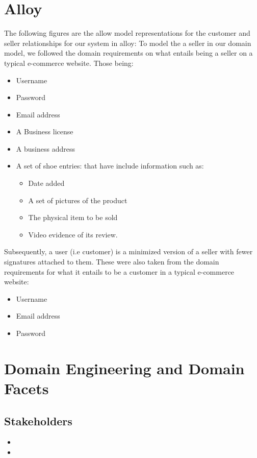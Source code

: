 \section{Alloy}
The following figures are the allow model representations for the customer and seller relationships for our system in alloy:
To model the a seller in our domain model, we followed the domain requirements on what entails being a seller on a typical e-commerce website. Those being:
\begin{itemize}
  \item Username
  \item Password
  \item Email address
  \item A Business license
  \item A business address
  \item A set of shoe entries: that have include information such as:
  \begin{itemize}
    \item Date added
    \item A set of pictures of the product
    \item The physical item to be sold
    \item Video evidence of its review.
  \end{itemize}
\end{itemize}
Subsequently, a user (i.e customer) is a minimized version of a seller with fewer signatures attached to them. These were also taken from the domain requirements for what it entails to be a customer in a typical e-commerce website:
\begin{itemize}
  \item Username
  \item Email address
  \item Password
\end{itemize}
\section{Domain Engineering and Domain Facets}
\subsection{Stakeholders}
\begin{itemize}
  \item {}
  \item {}
\end{itemize}
